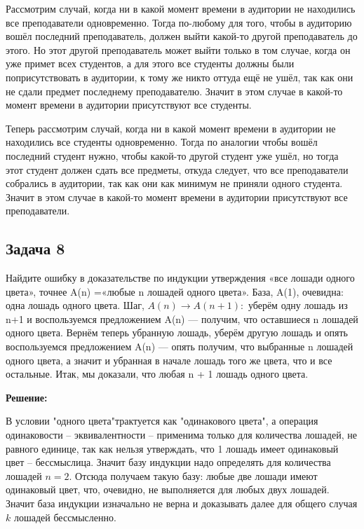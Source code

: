 \documentclass[a4paper,14pt]{article} %
\begin{document}
Рассмотрим случай, когда ни в какой момент времени в аудитории не находились все преподаватели одновременно. Тогда по-любому для того, чтобы в аудиторию вошёл последний преподаватель, должен выйти какой-то другой преподаватель до этого. Но этот другой преподаватель может выйти только в том случае, когда он уже примет всех студентов, а для этого все студенты должны были поприсутствовать в аудитории, к тому же никто оттуда ещё не ушёл, так как они не сдали предмет последнему преподавателю. Значит в этом случае в какой-то момент времени в аудитории присутствуют все студенты.

Теперь рассмотрим случай, когда ни в какой момент времени в аудитории не находились все студенты одновременно. Тогда по аналогии чтобы вошёл последний студент нужно, чтобы какой-то другой студент уже ушёл, но тогда этот студент должен сдать все предметы, откуда следует, что все преподаватели собрались в аудитории, так как они как минимум не приняли одного студента. Значит в этом случае в какой-то момент времени в аудитории присутствуют все преподаватели.

\newpage
\begin{center}
\subsection{Задача 8}
\end{center}

Найдите ошибку в доказательстве по индукции утверждения «все
лошади одного цвета», точнее A(n) =«любые n лошадей одного цвета».
База, A(1), очевидна: одна лошадь одного цвета. Шаг, $A(n) \rightarrow A(n + 1):$
уберём одну лошадь из n+1 и воспользуемся предложением A(n) — получим, что оставшиеся n лошадей одного цвета. Вернём теперь убранную
лошадь, уберём другую лошадь и опять воспользуемся предложением
A(n) — опять получим, что выбранные n лошадей одного цвета, а значит и убранная в начале лошадь того же цвета, что и все остальные.
Итак, мы доказали, что любая n + 1 лошадь одного цвета.
 
\newpage
\begin{center}
\bfseries
{\Large Решение: }
\end{center}


В условии "одного цвета"\hspace{1mm}трактуется как "одинакового цвета"\hspace{1mm}, а операция одинаковости -- эквивалентности -- применима только для количества лошадей, не равного единице, так как нельзя утверждать, что 1 лошадь имеет одинаковый цвет -- бессмыслица. Значит базу индукции надо определять для количества лошадей $n = 2$. Отсюда получаем такую базу: любые две лошади имеют одинаковый цвет, что, очевидно, не выполняется для любых двух лошадей. Значит база индукции изначально не верна и доказывать далее для общего случая $k$ лошадей бессмысленно.
\end{document}
